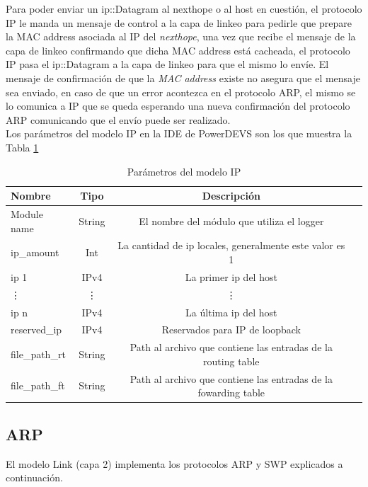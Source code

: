 \documentclass[10pt,a4paper]{article}
\begin{document}
Para poder enviar un ip::Datagram al nexthope o al host en cuestión, el protocolo IP le manda un mensaje de control a la capa de linkeo para pedirle que prepare la MAC address asociada al IP del \textit{nexthope}, una vez que recibe el mensaje de la capa de linkeo confirmando que dicha MAC address está cacheada, el protocolo IP pasa el ip::Datagram a la capa de linkeo para que el mismo lo envíe. El mensaje de confirmación de que la \textit{MAC address} existe no asegura que el mensaje sea enviado, en caso de que un error acontezca en el protocolo ARP, el mismo se lo comunica a IP que se queda esperando una nueva confirmación del protocolo ARP comunicando que el envío puede ser realizado. \\

Los parámetros del modelo IP en la IDE de PowerDEVS son los que muestra la Tabla \ref{table: patameters IP}

\begin{table}[h]
\begin{tabular}{|l|c|c|c|}
  \hline
  \textbf{Nombre} & \textbf{Tipo} & \textbf{Descripción} \\
  \hline
  Module name & String & El nombre del módulo que utiliza el logger \\
  \hline
  ip\_amount & Int & La cantidad de ip locales, generalmente este valor es 1 \\
  \hline
  ip 1 & IPv4 & La primer ip del host \\
  \hline
  \vdots & \vdots & \vdots \\
  \hline
  ip n & IPv4 & La última ip del host \\
  \hline
  reserved\_ip & IPv4 & Reservados para IP de loopback \\
  \hline
  file\_path\_rt & String & Path al archivo que contiene las entradas de la routing table \\
  \hline
  file\_path\_ft & String & Path al archivo que contiene las entradas de la fowarding table \\
  \hline
\end{tabular}
\label{table: patameters IP}
\caption{Parámetros del modelo IP}
\end{table}

\subsection{ARP}

El modelo Link (capa 2) implementa los protocolos ARP y SWP explicados a continuación. \\
\end{document}
